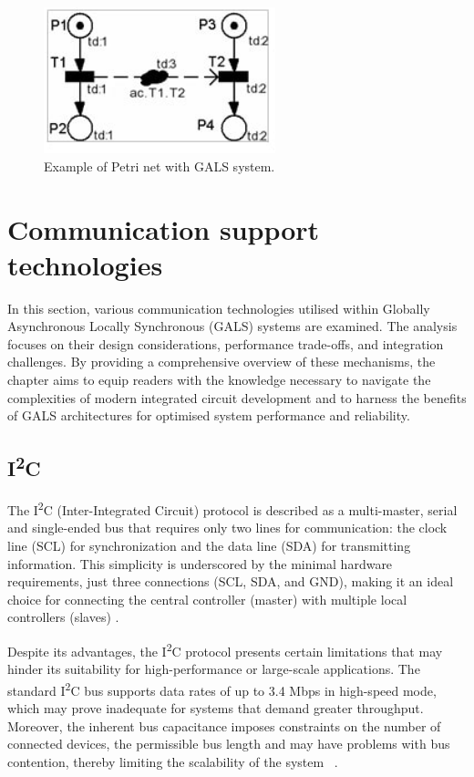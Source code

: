 \begin{figure}[htbp]
  \centering
  \includegraphics[width=0.6\textwidth]{Chapters/Figures/petrigals.jpg}
  \caption{Example of Petri net with GALS system.}
  \label{fig:petrigals}
\end{figure}



\section{Communication support technologies}
\label{sec:communication_support_technologies}

In this section, various communication technologies utilised within Globally Asynchronous Locally Synchronous (GALS) systems are examined. The analysis focuses on their design considerations, performance trade-offs, and integration challenges. By providing a comprehensive overview of these mechanisms, the chapter aims to equip readers with the knowledge necessary to navigate the complexities of modern integrated circuit development and to harness the benefits of GALS architectures for optimised system performance and reliability.


\subsection{I\textsuperscript{2}C}
\label{subsub:i2c}

The I\textsuperscript{2}C  (Inter-Integrated Circuit) protocol is described as a multi-master, serial and single-ended bus that requires only two lines for communication: the clock line (SCL) for synchronization and the data line (SDA) for transmitting information. This simplicity is underscored by the minimal hardware requirements, just three connections (SCL, SDA, and GND), making it an ideal choice for connecting the central controller (master) with multiple local controllers (slaves) \cite{i2c}.

Despite its advantages, the I\textsuperscript{2}C  protocol presents certain limitations that may hinder its suitability for high-performance or large-scale applications. The standard I\textsuperscript{2}C bus supports data rates of up to 3.4 Mbps in high-speed mode, which may prove inadequate for systems that demand greater throughput. Moreover, the inherent bus capacitance imposes constraints on the number of connected devices, the permissible bus length and may have problems with bus contention, thereby limiting the scalability of the system ~\cite{I2Cv2}.

